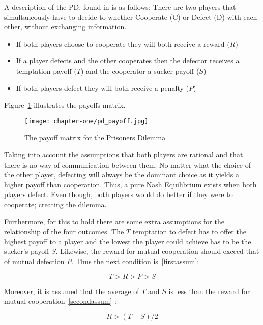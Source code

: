 A description of the PD, found in \cite{Li2011} is as follows:
There are two players that simultaneously have to decide to whether Cooperate (C)
or Defect (D) with each other, without exchanging information.

\begin{itemize}
  \item If both players choose to cooperate they will both receive a reward (\(R\))
  \item If a player defects and the other cooperates then the defector receives
  a temptation payoff (\(T\)) and the cooperator a sucker payoff (\(S\))
  \item If both players defect they will both receive a penalty (\(P\))
\end{itemize}

Figure~\ref{fig:pd_payoff} illustrates the payoffs matrix.

\begin{figure}[h!]
    \centering
    \texttt{[image: chapter-one/pd\_payoff.jpg]}
    \caption{The payoff matrix for the Prisoners Dilemma}
    \label{fig:pd_payoff}
\end{figure}

Taking into account the assumptions that both players are rational
and that there is no way of communication between them. No matter what the choice
of the other player, defecting will always be the dominant choice as it yields
a higher payoff than cooperation.
Thus, a pure Nash Equilibrium exists when both players defect. Even though, both
players would do better if they were to cooperate; creating the dilemma.

Furthermore, for this to hold there are some extra assumptions for the
relationship of the four outcomes. The \(T\) temptation to defect has to offer the
highest payoff to a player and the lowest the player could achieve has to be the sucker's
payoff \(S\).
Likewise, the reward for mutual cooperation should exceed that of mutual
defection \(P\). Thus the next condition is~\ref{firstassum}:

\begin{equation}\label{firstassum}
 T > R > P > S
\end{equation}

Moreover, it is assumed that the average of \(T\) and \(S\) is less than the reward for
mutual cooperation~\ref{secondassum} :

\begin{equation}\label{secondassum}
    R > (T+S)/2
\end{equation}

